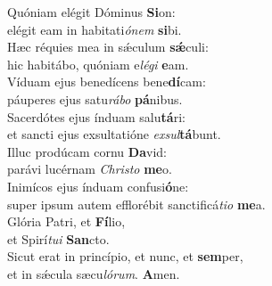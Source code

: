 \evenverse Quóniam elégit Dóminus \textbf{Si}on:~\*\\
\evenverse elégit eam in habitati\textit{ó}\textit{nem} \textbf{si}bi.\\
\oddverse Hæc réquies mea in sǽculum \textbf{sǽ}culi:~\*\\
\oddverse hic habitábo, quóniam e\textit{lé}\textit{gi} \textbf{e}am.\\
\evenverse Víduam ejus benedícens bene\textbf{dí}cam:~\*\\
\evenverse páuperes ejus satu\textit{rá}\textit{bo} \textbf{pá}nibus.\\
\oddverse Sacerdótes ejus índuam salu\textbf{tá}ri:~\*\\
\oddverse et sancti ejus exsultatióne \textit{ex}\textit{sul}\textbf{tá}bunt.\\
\evenverse Illuc prodúcam cornu \textbf{Da}vid:~\*\\
\evenverse parávi lucérnam \textit{Chri}\textit{sto} \textbf{me}o.\\
\oddverse Inimícos ejus índuam confusi\textbf{ó}ne:~\*\\
\oddverse super ipsum autem efflorébit sanctificá\textit{ti}\textit{o} \textbf{me}a.\\
\evenverse Glória Patri, et \textbf{Fí}lio,~\*\\
\evenverse et Spirí\textit{tu}\textit{i} \textbf{San}cto.\\
\oddverse Sicut erat in princípio, et nunc, et \textbf{sem}per,~\*\\
\oddverse et in sǽcula sæcu\textit{ló}\textit{rum}. \textbf{A}men.\\
